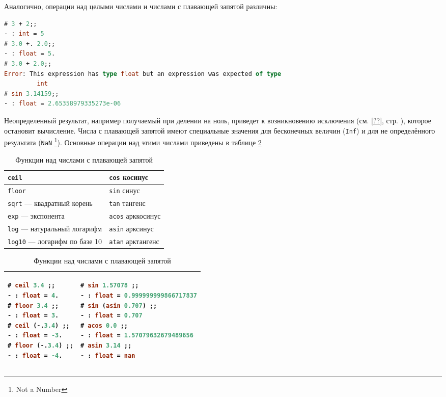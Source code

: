 Аналогично, операции над целыми числами и числами с плавающей запятой различны:

\begin{lstlisting}[language=OCaml]
# 3 + 2;;
- : int = 5
# 3.0 +. 2.0;;
- : float = 5.
# 3.0 + 2.0;;
Error: This expression has type float but an expression was expected of type
         int
# sin 3.14159;;
- : float = 2.65358979335273e-06
\end{lstlisting}

Неопределенный результат, например получаемый при делении на ноль, приведет к
возникновению исключения (см. \ref{??}, стр. \pageref{??}), которое остановит
вычисление. Числа с плавающей запятой имеют специальные значения для бесконечных
величин (\texttt{Inf}) и для не определённого результата (\texttt{NaN}
\footnote{Not a Number}). Основные операции над этими числами приведены в
таблице \ref{tbl:functions_on_floats}

\begin{table}[hl]
\begin{center}
	\caption{Функции над числами с плавающей запятой}
	\begin{tabular}{|p{7.2cm}|p{7.2cm}|}
	\hline
	\texttt{ceil} & \texttt{cos} косинус \\
	\hline
	\texttt{floor} & \texttt{sin} синус \\
	\hline
	\texttt{sqrt} --- квадратный корень & \texttt{tan} тангенс \\
	\hline
	\texttt{exp} --- экспонента & \texttt{acos} арккосинус \\
	\hline
	\texttt{log} --- натуральный логарифм & \texttt{asin} арксинус \\
	\hline
	\texttt{log10} --- логарифм по базе 10 & \texttt{atan} арктангенс \\
	\hline
	\end{tabular}
	\begin{tabular}{|p{7.2cm}|p{7.2cm}|}
	\hline
{\begin{lstlisting}[language=OCaml,frame=none]
# ceil 3.4 ;;
- : float = 4.
# floor 3.4 ;;
- : float = 3.
# ceil (-.3.4) ;;
- : float = -3.
# floor (-.3.4) ;;
- : float = -4.
\end{lstlisting}}
 &
{\begin{lstlisting}[language=OCaml,frame=none]
# sin 1.57078 ;;
- : float = 0.999999999866717837
# sin (asin 0.707) ;;
- : float = 0.707
# acos 0.0 ;;
- : float = 1.57079632679489656
# asin 3.14 ;;
- : float = nan
\end{lstlisting}}
\\
	\hline
	\end{tabular}
	\label{tbl:functions_on_floats}
\end{center}
\end{table}

